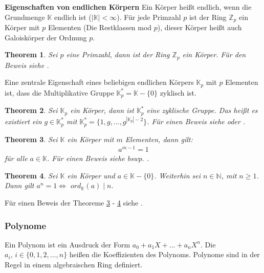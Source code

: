 \documentclass[12pt,oneside]{article}
\newtheorem{theorem}{Theorem}[section]
\theoremstyle{remark}
\theoremstyle{definition}
\begin{document}
\textbf{Eigenschaften von endlichen Körpern}\newline
Ein Körper heißt endlich, wenn die Grundmenge $\mathbb{K}$ endlich ist ($|\mathbb{K}| < \infty$). Für jede Primzahl $p$ ist der Ring $\mathbb{Z}_p$ ein Körper mit $p$ Elementen (Die Restklassen mod $p$), dieser Körper heißt auch Galoiskörper der Ordnung $p$.

\begin{theorem}
Sei $p$ eine Primzahl, dann ist der Ring $\mathbb{Z}_p$ ein Körper. Für den Beweis siehe \cite{fields}.
\end{theorem}

\smallskip

Eine zentrale Eigenschaft eines beliebigen endlichen Körpers $\mathbb{K}_p$ mit $p$ Elementen ist, dass die Multiplikative Gruppe $\mathbb{K}_p^{*} = \mathbb{K} - \{ 0\}$ zyklisch ist.

\begin{theorem}
Sei $\mathbb{K}_p$ ein Körper, dann ist $\mathbb{K}_p^{*}$ eine zyklische Gruppe. Das heißt es existiert ein $g \in \mathbb{K}_p^{*}$ mit $\mathbb{K}_p^{*} = \{1,g, \dots, g^{|\mathbb{K}_{p}| - 2} \}$. Für einen Beweis siehe \cite{D73} oder \cite{fields}. 
\end{theorem}

\begin{theorem}\label{th-fields-1}
Sei $\mathbb{K}$ ein Körper mit $m$ Elementen, dann gilt:
\begin{align*}
    a^{m-1} = 1
\end{align*}
für alle $a \in \mathbb{K}$. Für einen Beweis siehe bswp. \cite{kreisP}.
\end{theorem}



\smallskip

\begin{theorem}\label{th-fields-2}
Sei $\mathbb{K}$ ein Körper und $a \in \mathbb{K} - \{ 0 \}$. Weiterhin sei $ n \in \mathbb{N}$, mit $n \geq 1$. Dann gilt $a^n = 1 \Leftrightarrow	 $ $ord_{\mathbb{K}}(a) \mid n$. 
\end{theorem}

Für einen Beweis der Theoreme \ref{th-fields-1} - \ref{th-fields-2} siehe \cite{fields}.

\subsubsection{Polynome}
Ein Polynom ist ein Ausdruck der Form $a_0 + a_{1} X + \dots + a_{n}X^n$. Die $a_{i}, \, i \in \{0, 1,2, \dots, n\}$ heißen die Koeffizienten des Polynoms. Polynome sind in der Regel in einem algebraischen Ring definiert.
\end{document}
